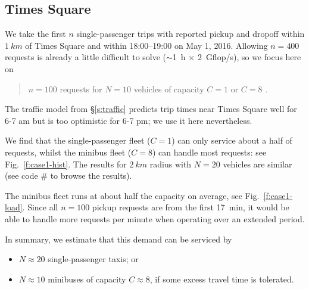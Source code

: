 \documentclass[12pt,notitlepage]{article}
\begin{document}
\subsection[Times Square]{Times Square}
\label{s:case1}

\edef\codecaseone{\thecodeindex}

We take
the first $n$ single-passenger trips 
with
reported pickup and dropoff 
within
$\SI{1}{km}$ of Times Square
and
within 
18:00--19:00 on May 1, 2016.
%
%	
Allowing $n = 400$ requests
is already a little difficult to solve ($\sim$\SI{1}{h} $\times$ \SI{2}{Gflop/s}),
so we focus here on
\begin{quote}
	$n = 100$ requests
	for
	$N = 10$ vehicles of capacity $C = 1$ or $C = 8$
	.
\end{quote}


%

The traffic model from \S\ref{s:traffic} predicts trip times
near Times Square well for 6-7 am
but is too optimistic for 6-7 pm;
we use it here nevertheless.
%
\edef\codetriptime{\thecodeindex}

%

We find that the single-passenger fleet ($C = 1$)
can only service about a half of requests,
whilst
the minibus fleet ($C = 8$) can handle most requests:
see Fig.~\ref{f:case1-hist}.
%
%
The results for $\SI{2}{km}$ radius with $N = 20$ 
vehicles are similar (see code \#\codecaseone\xspace to browse the results).

%

The minibus fleet runs at about half the capacity on average, see Fig.~\ref{f:case1-load}.
%
Since all $n = 100$ pickup requests are from the first \SI{17}{min},
it would be able to handle more requests per minute
when operating over an extended period.

%

In summary,
we estimate that this demand can be serviced by 
\begin{itemize}
\item 
	$N \approx 20$ single-passenger taxis; or
\item
	$N \approx 10$ minibuses of capacity $C \approx 8$,
	if some excess travel time is tolerated.
\end{itemize}

%


\end{document}
